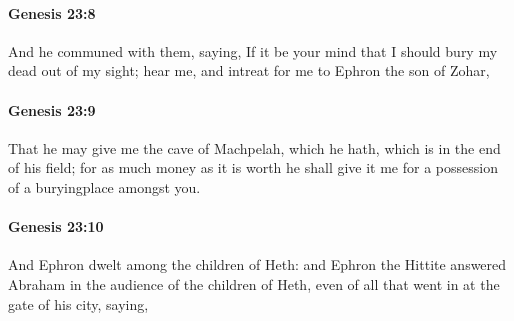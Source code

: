 		\paragraph{Genesis 23:8} %
			\label{GENESIS-23-8}

			And he communed with them, saying, If it be your mind that I should bury my dead out of my sight; hear me, and intreat for me to Ephron the son of Zohar,


		\paragraph{Genesis 23:9} %
			\label{GENESIS-23-9}

			That he may give me the cave of Machpelah, which he hath, which is in the end of his field; for as much money as it is worth he shall give it me for a possession of a buryingplace amongst you.


		\paragraph{Genesis 23:10} %
			\label{GENESIS-23-10}

			And Ephron dwelt among the children of Heth: and Ephron the Hittite answered Abraham in the audience of the children of Heth, even of all that went in at the gate of his city, saying,



